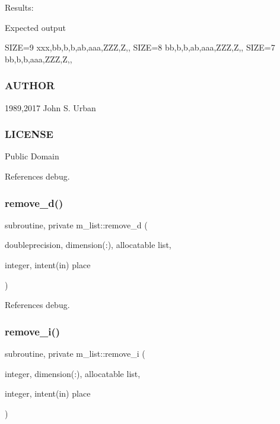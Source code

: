 Results\+:

Expected output

S\+I\+ZE=9 xxx,bb,b,b,ab,aaa,Z\+ZZ,Z,, S\+I\+ZE=8 bb,b,b,ab,aaa,Z\+ZZ,Z,, S\+I\+ZE=7 bb,b,b,aaa,Z\+ZZ,Z,,

\subsubsection*{A\+U\+T\+H\+OR}

1989,2017 John S. Urban \subsubsection*{L\+I\+C\+E\+N\+SE}

Public Domain 

References debug.

\mbox{\label{namespacem__list_a6c5f971866302b40b5952ad919203461}} 
\subsubsection{\texorpdfstring{remove\+\_\+d()}{remove\_d()}}
{\footnotesize\ttfamily subroutine, private m\+\_\+list\+::remove\+\_\+d (\begin{DoxyParamCaption}\item[{doubleprecision, dimension(\+:), allocatable}]{list,  }\item[{integer, intent(in)}]{place }\end{DoxyParamCaption})\hspace{0.3cm}{\ttfamily [private]}}



References debug.

\mbox{\label{namespacem__list_acdc3299515ed0402f4213d76d3e4d4cf}} 
\subsubsection{\texorpdfstring{remove\+\_\+i()}{remove\_i()}}
{\footnotesize\ttfamily subroutine, private m\+\_\+list\+::remove\+\_\+i (\begin{DoxyParamCaption}\item[{integer, dimension(\+:), allocatable}]{list,  }\item[{integer, intent(in)}]{place }\end{DoxyParamCaption})\hspace{0.3cm}{\ttfamily [private]}}



